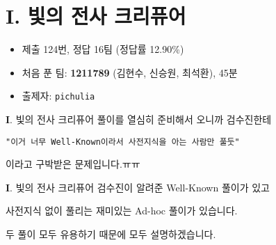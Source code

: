 \section{I. 빛의 전사 크리퓨어}

\begin{frame} %
    \begin{itemize}
        \item 제출 124번, 정답 16팀 (정답률 12.90\%)
        \item 처음 푼 팀: \textbf{1211789} (김현수, 신승원, 최석환), 45분
        \item 출제자: \texttt{pichulia}
    \end{itemize}
\end{frame}

\begin{frame}{\textbf{I}. 빛의 전사 크리퓨어}
    풀이를 열심히 준비해서 오니까 검수진한테
    
    \vspace{18pt}
    
    \texttt{"이거 너무 Well-Known이라서 사전지식을 아는 사람만 풀둣"}
    
    \vspace{18pt}
    
    이라고 구박받은 문제입니다.ㅠㅠ
\end{frame}

\begin{frame}{\textbf{I}. 빛의 전사 크리퓨어}
    검수진이 알려준 Well-Known 풀이가 있고
    
    사전지식 없이 풀리는 재미있는 Ad-hoc 풀이가 있습니다.
    
    \vspace{18pt}
    
    두 풀이 모두 유용하기 때문에 모두 설명하겠습니다.
\end{frame}

